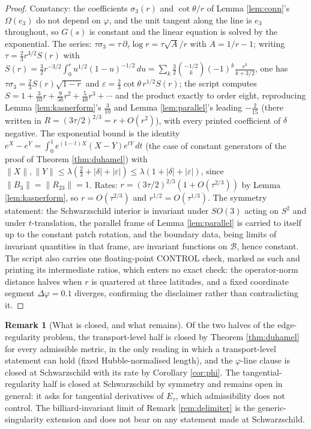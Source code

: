 \documentclass[11pt]{article}
\theoremstyle{definition}
\newtheorem{remark}[theorem]{Remark}
\begin{document}
\begin{proof}
Constancy: the coefficients $\sigma_{3}(r)$ and $\cot\theta/r$ of Lemma \ref{lem:conn}'s $\Omega(e_{3})$ do not depend on $\varphi$, and the unit tangent along the line is $e_{3}$ throughout, so $G(s)$ is constant and the linear equation is solved by the exponential. The series: $\tau\sigma_{3} = \tau\,\partial_{\tau}\log r = \tau\sqrt{A}/r$ with $A = 1/r - 1$; writing $\tau = \tfrac23 r^{3/2} S(r)$ with $S(r) = \tfrac32 r^{-3/2}\int_{0}^{r} u^{1/2}(1-u)^{-1/2}\,du = \sum_{k} \tfrac{3}{2}\binom{-1/2}{k}(-1)^{k}\frac{r^{k}}{k + 3/2}$, one has $\tau\sigma_{3} = \tfrac23 S(r)\sqrt{1 - r}$ and $\varepsilon = \tfrac23 \cot\theta\, r^{1/2} S(r)$; the script computes $S = 1 + \tfrac{3}{10} r + \tfrac{9}{56} r^{2} + \tfrac{5}{48} r^{3} + \cdots$ and the product exactly to order eight, reproducing Lemma \ref{lem:kasnerform}'s $\tfrac{3}{10}$ and Lemma \ref{lem:parallel}'s leading $-\tfrac{2}{15}$ (there written in $R = (3\tau/2)^{2/3} = r + O(r^{2})$), with every printed coefficient of $\delta$ negative. The exponential bound is the identity $e^{X} - e^{Y} = \int_{0}^{1} e^{(1-t)X}(X - Y)e^{tY}\,dt$ (the case of constant generators of the proof of Theorem \ref{thm:duhamel}) with $\|X\|, \|Y\| \le \lambda(\tfrac23 + |\delta| + |\varepsilon|) \le \lambda(1 + |\delta| + |\varepsilon|)$, since $\|B_3\| = \|R_{23}\| = 1$. Rates: $r = (3\tau/2)^{2/3}(1 + O(\tau^{2/3}))$ by Lemma \ref{lem:kasnerform}, so $r = O(\tau^{2/3})$ and $r^{1/2} = O(\tau^{1/3})$. The symmetry statement: the Schwarzschild interior is invariant under $SO(3)$ acting on $S^{2}$ and under $t$-translation, the parallel frame of Lemma \ref{lem:parallel} is carried to itself up to the constant patch rotation, and the boundary data, being limits of invariant quantities in that frame, are invariant functions on $\mathcal{B}$, hence constant. The script also carries one floating-point CONTROL check, marked as such and printing its intermediate ratios, which enters no exact check: the operator-norm distance halves when $r$ is quartered at three latitudes, and a fixed coordinate segment $\Delta\varphi = 0.1$ diverges, confirming the disclaimer rather than contradicting it.
\end{proof}

\begin{remark}[What is closed, and what remains]\label{rem:tangential}
Of the two halves of the edge-regularity problem, the transport-level half is closed by Theorem \ref{thm:duhamel} for every admissible metric, in the only reading in which a transport-level statement can hold (fixed Hubble-normalised length), and the $\varphi$-line clause is closed at Schwarzschild with its rate by Corollary \ref{cor:phi}. The tangential-regularity half is closed at Schwarzschild by symmetry and remains open in general: it asks for tangential derivatives of $E_{\tau}$, which admissibility does not control. The billiard-invariant limit of Remark \ref{rem:delimiter} is the generic-singularity extension and does not bear on any statement made at Schwarzschild.
\end{remark}
\end{document}
